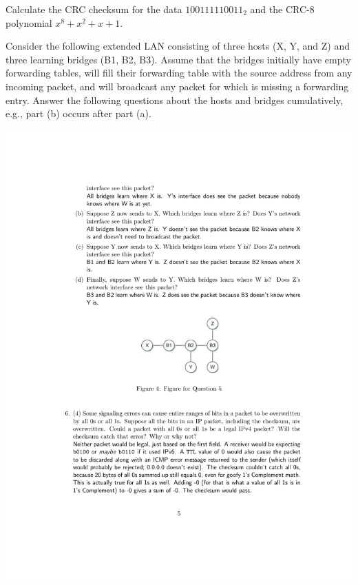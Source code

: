\documentclass[12pt,addpoints,answers]{exam}
\begin{document}
\begin{questions}
\question[8] Calculate the CRC checksum for the data $100111110011_2$ and the CRC-8 polynomial $x^8 + x^2 + x + 1$.
\begin{solution}
\end{solution}

\question Consider the following extended LAN consisting of three hosts (X, Y, and Z) and three learning bridges (B1, B2, B3). Assume that the bridges initially have empty forwarding tables, will fill their forwarding table with the source address from any incoming packet, and will broadcast any packet for which is missing a forwarding entry. Answer the following questions about the hosts and bridges cumulatively, e.g., part (b) occurs after part (a).
\begin{center}\includegraphics[width=0.35\linewidth]{fig/simple.pdf}\end{center}
\end{questions}
\end{document}
